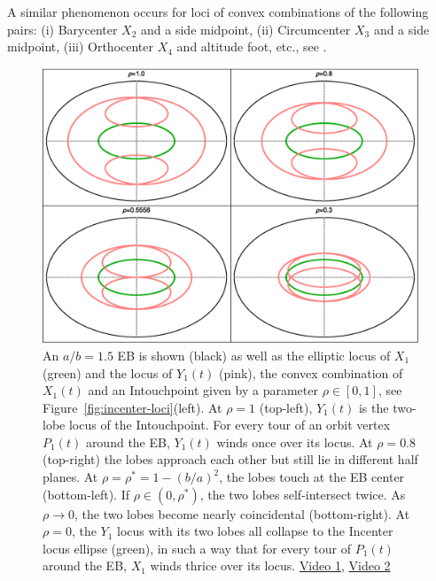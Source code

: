 A similar phenomenon occurs for loci of convex combinations of the following pairs: (i) Barycenter $X_2$ and a side midpoint, (ii) Circumcenter $X_3$ and a side midpoint, (iii) Orthocenter $X_4$ and altitude foot, etc., see \cite[pl\#11,12]{dsr_playlist_2020}.

\begin{figure}
    \centering
    \includegraphics[width=\textwidth]{pics_1090_conv_inc_pedal.eps}
    \caption{An $a/b=1.5$ EB is shown (black) as well as the elliptic locus of $X_1$ (green) and the locus of $Y_1(t)$ (pink), the convex combination of $X_1(t)$ and an Intouchpoint given by a parameter $\rho\in[0,1]$, see Figure~\ref{fig:incenter-loci}(left). At $\rho=1$ (top-left), $Y_1(t)$ is the two-lobe locus of the Intouchpoint. For every tour of an orbit vertex $P_1(t)$ around the EB, $Y_1(t)$ winds once over its locus. At $\rho=0.8$ (top-right) the lobes approach each other but still lie in different half planes. At $\rho=\rho^*=1-(b/a)^2$, the lobes touch at the EB center (bottom-left). If $\rho\in(0,\rho^*)$, the two lobes self-intersect twice. As $\rho{\rightarrow}0$, the two lobes become nearly coincidental (bottom-right). At $\rho=0$, the $Y_1$ locus with its two lobes all collapse to the Incenter locus ellipse (green), in such a way that for every tour of $P_1(t)$ around the EB, $X_1$ winds thrice over its locus. \href{https://youtu.be/3Gr3Nh5-jHs}{Video 1}, \href{https://youtu.be/HZFjkWD_CnE}{Video 2}}
    \label{fig:inc-wind3}
\end{figure}
 